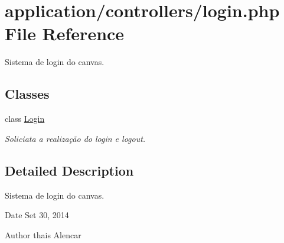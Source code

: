 \hypertarget{login_8php}{\section{application/controllers/login.php File Reference}
\label{login_8php}
}


Sistema de login do canvas.  


\subsection*{Classes}
\begin{DoxyCompactItemize}
\item 
class \hyperlink{classLogin}{Login}
\begin{DoxyCompactList}\small\item\em Soliciata a realização do login e logout. \end{DoxyCompactList}\end{DoxyCompactItemize}


\subsection{Detailed Description}
Sistema de login do canvas. \begin{DoxyDate}{Date}
Set 30, 2014 
\end{DoxyDate}
\begin{DoxyAuthor}{Author}
thais Alencar 
\end{DoxyAuthor}
